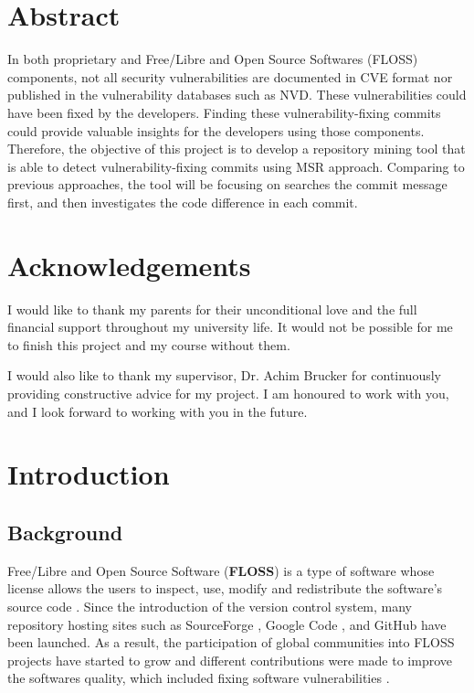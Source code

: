 \documentclass[12pt, a4paper]{report}
\begin{document}
\newpage

\chapter*{Abstract}
In both proprietary and Free/Libre and Open Source Softwares (FLOSS) components, not all security
vulnerabilities are documented in CVE format nor published in the vulnerability databases such as
NVD. These vulnerabilities could have been fixed by the developers. Finding these
vulnerability-fixing commits could provide valuable insights for the developers using those
components. Therefore, the objective of this project is to develop a repository mining tool that is
able to detect vulnerability-fixing commits using MSR approach. Comparing to previous approaches,
the tool will be focusing on searches the commit message first, and then investigates the code
difference in each commit.

\chapter*{Acknowledgements}
I would like to thank my parents for their unconditional love and the full financial support
throughout my university life. It would not be possible for me to finish this project and my course
without them.

I would also like to thank my supervisor, Dr. Achim Brucker for continuously providing constructive
advice for my project. I am honoured to work with you, and I look forward to working with you in the
future.

\newpage

\tableofcontents

\listoffigures

\listoftables

\newpage


\chapter{Introduction}
\section{Background}
Free/Libre and Open Source Software (\textbf{FLOSS}) is a type of software whose license allows the
users to inspect, use, modify and redistribute the software's source code \cite{crowston_2012}.
Since the introduction of the version control system, many repository hosting sites such as
SourceForge \cite{sourceforge}, Google Code \cite{google_code}, and GitHub \cite{github} have been
launched. As a result, the participation of global communities into FLOSS projects have started to
grow and different contributions were made to improve the softwares quality, which included fixing
software vulnerabilities \cite{dabbish_2012}.
\end{document}
